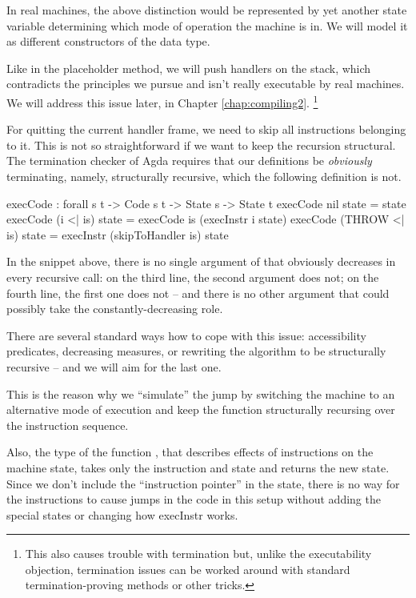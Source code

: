 In real machines, the above distinction would be represented by yet another
state variable determining which mode of operation the machine is in.
We will model it as different constructors of the  data type.

Like in the placeholder method, we will push handlers on the stack, which
contradicts the principles we pursue and isn't really executable by real
machines. We will address this issue later, in Chapter \ref{chap:compiling2}.%
\footnote{This also causes trouble with termination but, unlike the
executability objection, termination issues can be worked around with
standard termination-proving methods or other tricks.}

For quitting the current handler frame, we need to skip all instructions
belonging to it. This is not so straightforward if we want to keep the
recursion structural. The termination checker of Agda requires that our
definitions be \emph{obviously} terminating, namely, structurally recursive,
which the following definition is not.
\begin{code}
  execCode : forall {s t} -> Code s t -> State s -> State t
  execCode nil state = state
  execCode (i <| is) state = execCode is (execInstr i state)
  execCode (THROW <| is) state = execInstr (skipToHandler is) state
\end{code}
In the snippet above, there is no single argument of  that
obviously decreases in every recursive call: on the third line, the second
argument does not; on the fourth line, the first one does not -- and there
is no other argument that could possibly take the constantly-decreasing role.

There are several standard ways how to cope with this issue: accessibility
predicates, decreasing measures, or rewriting the algorithm to be
structurally recursive -- and we will aim for the last one.

This is the reason why we ``simulate'' the jump by switching the machine to an
alternative mode of execution and keep the function 
structurally recursing over the instruction sequence.

Also, the type of the function , that describes effects of
instructions on the machine state, takes only the instruction and state and
returns the new state. Since we don't include the ``instruction pointer'' in
the state, there is no way for the instructions to cause jumps in the code in
this setup without adding the special states or changing how execInstr works.

